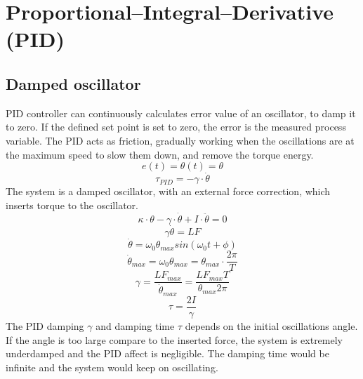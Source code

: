 \documentclass[\main/master.tex]{subfiles}
\begin{document}
\section{Proportional–Integral–Derivative (PID)}
\subsection{Damped oscillator}
PID controller can continuously calculates error value of an oscillator, to damp it to zero. If the defined set point is set to zero, the error is the measured process variable. The PID acts as friction, gradually working when the oscillations are at the maximum speed to slow them down, and remove the torque energy.
\begin{equation}
e(t) = \theta(t) = \theta   \label{eqn:error}
\end{equation}
\begin{equation}
\tau_{PID} = -\gamma\cdot\dot{\theta}   \label{eqn:friction_torque}
\end{equation}
The system is a damped oscillator, with an external force correction, which inserts torque to the oscillator.
\begin{equation}
\kappa\cdot\theta - \gamma\cdot\dot{\theta}  + I\cdot\ddot{\theta} = 0   \label{eqn:damped__pid_motion_equation}
\end{equation}
\begin{equation}
\gamma\dot{\theta}  = LF   \label{eqn:damped__pid_motion_equation}
\end{equation}
\begin{equation}
\dot{\theta} = \omega_0\theta_{max}sin(\omega_0 t +\phi)    \label{eqn:undamped_motion_equation}
\end{equation}
\begin{equation}
\dot{\theta}_{max} = \omega_0\theta_{max} = \theta_{max}\cdot\frac{2\pi}{T}    \label{eqn:undamped_motion_equation}
\end{equation}
\begin{equation}
\gamma  = \frac{LF_{max}}{\dot{\theta}_{max}} =\frac{LF_{max}T}{\theta_{max}2\pi}    \label{eqn:damped_pid_motion_equation}
\end{equation}
\begin{equation}
\tau =  \frac{2I}{\gamma}  \label{eqn:damping_time}
\end{equation}
The PID damping $\gamma$ and damping time $\tau$ depends on the initial oscillations angle. If the angle is too large compare to the inserted force, the system is extremely underdamped and the PID affect is negligible. The damping time would be infinite and the system would keep on oscillating.
\end{document}
